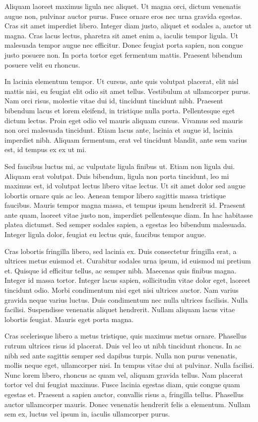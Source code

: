 Aliquam laoreet maximus ligula nec aliquet. Ut magna orci, dictum venenatis augue non, pulvinar auctor purus. Fusce ornare eros nec urna gravida egestas. Cras sit amet imperdiet libero. Integer diam justo, aliquet et sodales a, auctor ut magna. Cras lacus lectus, pharetra sit amet enim a, iaculis tempor ligula. Ut malesuada tempor augue nec efficitur. Donec feugiat porta sapien, non congue justo posuere non. In porta tortor eget fermentum mattis. Praesent bibendum posuere velit eu rhoncus.

In lacinia elementum tempor. Ut cursus, ante quis volutpat placerat, elit nisl mattis nisi, eu feugiat elit odio sit amet tellus. Vestibulum at ullamcorper purus. Nam orci risus, molestie vitae dui id, tincidunt tincidunt nibh. Praesent bibendum lacus et lorem eleifend, in tristique nulla porta. Pellentesque eget dictum lectus. Proin eget odio vel mauris aliquam cursus. Vivamus sed mauris non orci malesuada tincidunt. Etiam lacus ante, lacinia et augue id, lacinia imperdiet nibh. Aliquam fermentum, erat vel tincidunt blandit, ante sem varius est, id tempus ex ex ut mi.

Sed faucibus luctus mi, ac vulputate ligula finibus ut. Etiam non ligula dui. Aliquam erat volutpat. Duis bibendum, ligula non porta tincidunt, leo mi maximus est, id volutpat lectus libero vitae lectus. Ut sit amet dolor sed augue lobortis ornare quis ac leo. Aenean tempor libero sagittis massa tristique faucibus. Mauris tempor magna massa, et tempus ipsum hendrerit id. Praesent ante quam, laoreet vitae justo non, imperdiet pellentesque diam. In hac habitasse platea dictumst. Sed semper sodales sapien, a egestas leo bibendum malesuada. Integer ligula dolor, feugiat eu lectus quis, faucibus tempor augue.

Cras lobortis fringilla libero, sed lacinia ex. Duis consectetur fringilla erat, a ultrices metus euismod et. Curabitur sodales urna ipsum, id euismod mi pretium et. Quisque id efficitur tellus, ac semper nibh. Maecenas quis finibus magna. Integer id massa tortor. Integer lacus sapien, sollicitudin vitae dolor eget, laoreet tincidunt odio. Morbi condimentum nisi eget nisi ultrices auctor. Nam varius gravida neque varius luctus. Duis condimentum nec nulla ultrices facilisis. Nulla facilisi. Suspendisse venenatis aliquet hendrerit. Nullam aliquam lacus vitae lobortis feugiat. Mauris eget porta magna.

Cras scelerisque libero a metus tristique, quis maximus metus ornare. Phasellus rutrum ultrices risus id placerat. Duis vel leo ut nibh tincidunt rhoncus. In ac nibh sed ante sagittis semper sed dapibus turpis. Nulla non purus venenatis, mollis neque eget, ullamcorper nisi. In tempus vitae dui at pulvinar. Nulla facilisi. Nunc lorem libero, rhoncus ac quam vel, aliquam gravida tellus. Nam placerat tortor vel dui feugiat maximus. Fusce lacinia egestas diam, quis congue quam egestas et. Praesent a sapien auctor, convallis risus a, fringilla tellus. Phasellus auctor ullamcorper mauris. Donec venenatis hendrerit felis a elementum. Nullam sem ex, luctus vel ipsum in, iaculis ullamcorper purus.

